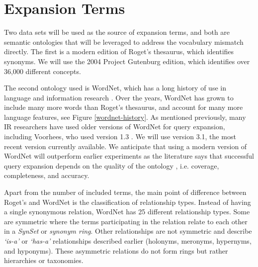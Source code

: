 
















\section{Expansion Terms}
Two data sets will be used as the source of expansion terms, and both are semantic ontologies that will be leveraged to address the vocabulary mismatch directly. The first is a modern edition of Roget's thesaurus, which identifies synonyms. We will use the 2004 Project Gutenburg edition, which identifies over 36,000 different concepts. 


The second ontology used is WordNet, which has a long history of use in language and information research \cite{fellbaum2010wordnet}. Over the years, WordNet has grown to include many more words than Roget's thesaurus, and account for many more language features, see Figure \ref{wordnet-history}. As mentioned previously, many IR researchers have used older versions of WordNet for query expansion, including Voorhees, who used version 1.3 \cite{Voorhees:1994:QEU:188490.188508}. We will use version 3.1, the most recent version currently available. We anticipate that using a modern version of WordNet will outperform earlier experiments as the literature says that successful query expansion depends on the quality of the ontology \cite{kim1990model, jones1993thesaurus}, i.e. coverage, completeness, and accuracy.

Apart from the number of included terms, the main point of difference between Roget's and WordNet is the classification of relationship types. Instead of having a single synonymous relation, WordNet has 25 different relationship types. Some are symmetric where the terms participating in the relation relate to each other in a \textit{SynSet} or \textit{synonym ring}. Other relationships are not symmetric and describe \textit{`is-a'} or \textit{`has-a'} relationships described earlier (holonyms, meronyms, hypernyms, and hyponyms). These asymmetric relations do not form rings but rather hierarchies or taxonomies.

